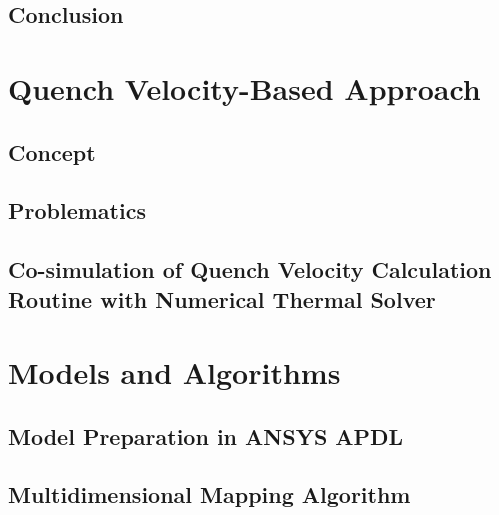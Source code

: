 \documentclass[11pt,a4paper]{report}
\begin{document}
\section{Conclusion}
\label{section: 1D_quench_propagation_conclusions}

 
\clearpage
\chapter{Quench Velocity-Based Approach}
\label{chapter:quench_velocity_modelling}

\section{Concept}
\label{section:quench_velocity_concept}


\section{Problematics}
\label{section:quench_velocity_problematics}


\section{Co-simulation of Quench Velocity Calculation Routine with Numerical Thermal Solver}
\label{section:quench_velocity_cosimulation}


\clearpage
\chapter{Models and Algorithms}
\label{chapter:algorithms}


\section{Model Preparation in ANSYS APDL}
\label{section:model_preparation}


\section{Multidimensional Mapping Algorithm}
\label{section:multidimensional_mapping_algorithm}

\end{document}
